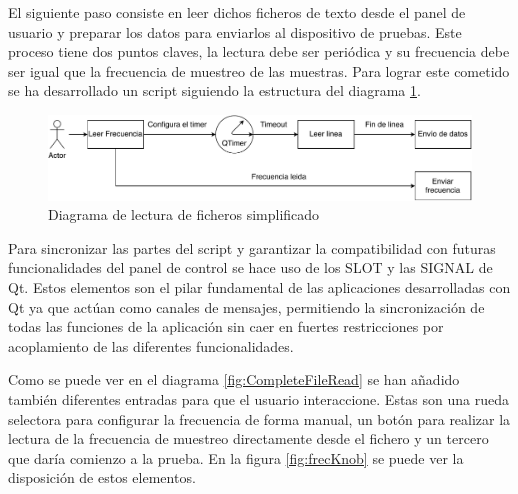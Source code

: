         El siguiente paso consiste en leer dichos ficheros de texto desde el panel de usuario y preparar los datos para enviarlos al dispositivo de pruebas. Este proceso tiene dos puntos claves, la lectura debe ser periódica y su frecuencia debe ser igual que la frecuencia de muestreo de las muestras. Para lograr este cometido se ha desarrollado un script siguiendo la estructura del diagrama \ref{fig:SimpleFileRead}. 

        \begin{figure}[H]  
                \centering
                        \includegraphics[width =\linewidth]{figuras/SimpleFileRead.pdf}
                \caption{Diagrama de lectura de ficheros simplificado}
                \label{fig:SimpleFileRead}
        \end{figure}

        Para sincronizar las partes del script y garantizar la compatibilidad con futuras funcionalidades del panel de control se hace uso de los SLOT y las SIGNAL de Qt. Estos elementos son el pilar fundamental de las aplicaciones desarrolladas con Qt ya que actúan como canales de mensajes, permitiendo la sincronización de todas las funciones de la aplicación sin caer en fuertes restricciones por acoplamiento de las diferentes funcionalidades.

        Como se puede ver en el diagrama \ref{fig:CompleteFileRead} se han añadido también diferentes entradas para que el usuario interaccione. Estas son una rueda selectora para configurar la frecuencia de forma manual, un botón para realizar la lectura de la frecuencia de muestreo directamente desde el fichero y un tercero que daría comienzo a la prueba. En la figura \ref{fig:frecKnob} se puede ver la disposición de estos elementos.

